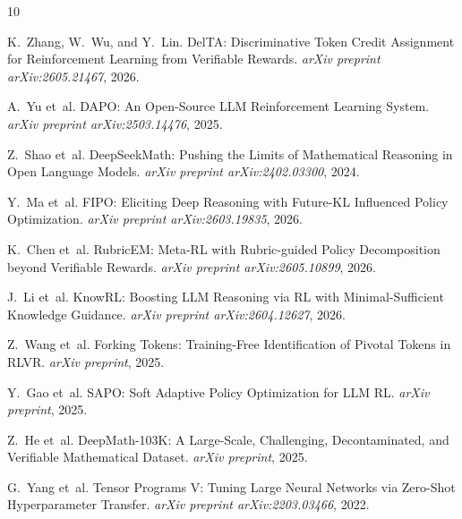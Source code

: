 \documentclass[11pt,a4paper]{article}
\begin{document}

\begin{thebibliography}{10}

K.~Zhang, W.~Wu, and Y.~Lin.
\newblock DelTA: Discriminative Token Credit Assignment for Reinforcement Learning from Verifiable Rewards.
\newblock \emph{arXiv preprint arXiv:2605.21467}, 2026.

A.~Yu et~al.
\newblock DAPO: An Open-Source LLM Reinforcement Learning System.
\newblock \emph{arXiv preprint arXiv:2503.14476}, 2025.

Z.~Shao et~al.
\newblock DeepSeekMath: Pushing the Limits of Mathematical Reasoning in Open Language Models.
\newblock \emph{arXiv preprint arXiv:2402.03300}, 2024.

Y.~Ma et~al.
\newblock FIPO: Eliciting Deep Reasoning with Future-KL Influenced Policy Optimization.
\newblock \emph{arXiv preprint arXiv:2603.19835}, 2026.

K.~Chen et~al.
\newblock RubricEM: Meta-RL with Rubric-guided Policy Decomposition beyond Verifiable Rewards.
\newblock \emph{arXiv preprint arXiv:2605.10899}, 2026.

J.~Li et~al.
\newblock KnowRL: Boosting LLM Reasoning via RL with Minimal-Sufficient Knowledge Guidance.
\newblock \emph{arXiv preprint arXiv:2604.12627}, 2026.

Z.~Wang et~al.
\newblock Forking Tokens: Training-Free Identification of Pivotal Tokens in RLVR.
\newblock \emph{arXiv preprint}, 2025.

Y.~Gao et~al.
\newblock SAPO: Soft Adaptive Policy Optimization for LLM RL.
\newblock \emph{arXiv preprint}, 2025.

Z.~He et~al.
\newblock DeepMath-103K: A Large-Scale, Challenging, Decontaminated, and Verifiable Mathematical Dataset.
\newblock \emph{arXiv preprint}, 2025.

G.~Yang et~al.
\newblock Tensor Programs V: Tuning Large Neural Networks via Zero-Shot Hyperparameter Transfer.
\newblock \emph{arXiv preprint arXiv:2203.03466}, 2022.

\end{thebibliography}
\end{document}
